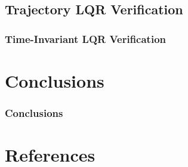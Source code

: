 \documentclass{beamer}
\begin{document}
\subsection{Trajectory LQR Verification}

\begin{frame}
\frametitle{Time-Invariant LQR Verification}

\end{frame}


\section{Conclusions}
\begin{frame}
\frametitle{Conclusions}

\end{frame}

\section{References}
\end{document}
